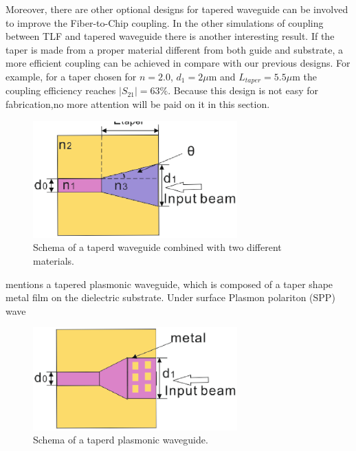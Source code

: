 Moreover, there are other optional designs for tapered waveguide can be involved to improve the Fiber-to-Chip coupling.  
In the other simulations of coupling between TLF and tapered waveguide there is another interesting result. If the taper is made from a proper material different from both guide and substrate, a more efficient coupling can be achieved in compare with our previous designs. For example, for a taper chosen for $n=2.0$, $d_{1}=2\mu$m and $L_{taper}=5.5\mu$m the coupling efficiency reaches $|S_{21}|=63\%$.  Because this design is not easy for fabrication,no more attention will be paid on it in this section.   
\begin{figure}[!ht]
\centering
\includegraphics[width=0.7\textwidth]{bilder/tapered_waveguide_others}
\caption{Schema of a taperd waveguide combined with two different materials.}
\label{fig:tapered_waveguide_others}
\end{figure}

\cite{tapered_plasmonic_waveguides} mentions a tapered plasmonic waveguide, which is composed of a taper shape metal film on the dielectric substrate.  Under surface Plasmon polariton (SPP) wave 
\begin{figure}[!ht]
\centering
\includegraphics[width=0.7\textwidth]{bilder/tapered_waveguide_plasmonic}
\caption{Schema of a taperd plasmonic waveguide.}
\label{fig:tapered_waveguide_plasmonic}
\end{figure}


